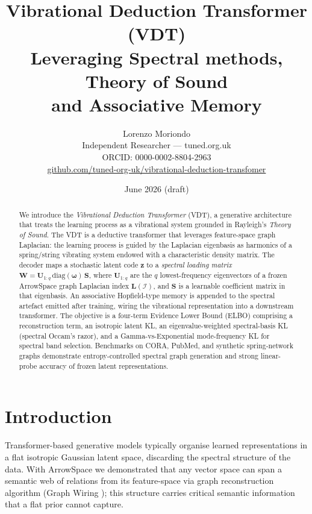 \documentclass[11pt,a4paper]{article}
\title{%
  \textbf{Vibrational Deduction Transformer (VDT)}\\[4pt]
  \large Leveraging Spectral methods, Theory of Sound\\
    and Associative Memory}
\author{%
  Lorenzo Moriondo\\[2pt]
\small Independent Researcher --- tuned.org.uk\\
\small ORCID: 0000-0002-8804-2963\\
  \href{https://github.com/tuned-org-uk/vibrational-deduction-transfomer}{%
    github.com/tuned-org-uk/vibrational-deduction-transfomer}}
\date{June 2026 (draft)}
\newcommand{\Lmat}{\mathbf{L}}
\newcommand{\Umat}{\mathbf{U}}
\newcommand{\Smat}{\mathbf{S}}
\newcommand{\Wmat}{\mathbf{W}}
\begin{document}

\maketitle

\begin{abstract}
We introduce the \emph{Vibrational Deduction Transformer} (VDT), a generative
architecture that treats the learning process as a vibrational system grounded
in Rayleigh's \emph{Theory of Sound}.
The VDT is a deductive transformer that leverages feature-space graph Laplacian:
the learning process is guided by the Laplacian eigenbasis as harmonics of a
spring/string vibrating system endowed with a characteristic density matrix.
The decoder maps a stochastic latent code $\mathbf{z}$ to a
\emph{spectral loading matrix} $\Wmat = \Umat_{1:q}\,\mathrm{diag}(\boldsymbol{\omega})\,\Smat$,
where $\Umat_{1:q}$ are the $q$ lowest-frequency eigenvectors of a frozen
ArrowSpace graph Laplacian index $\Lmat(\mathcal{I})$, and $\Smat$ is a learnable
coefficient matrix in that eigenbasis.
An associative Hopfield-type memory is appended to the spectral artefact emitted
after training, wiring the vibrational representation into a downstream transformer.
The objective is a four-term Evidence Lower Bound (ELBO) comprising a
reconstruction term, an isotropic latent KL, an eigenvalue-weighted
spectral-basis KL (spectral Occam's razor), and a Gamma-vs-Exponential
mode-frequency KL for spectral band selection.
Benchmarks on CORA, PubMed, and synthetic spring-network graphs demonstrate
entropy-controlled spectral graph generation and strong linear-probe accuracy
of frozen latent representations.
\end{abstract}

\tableofcontents
\newpage

\section{Introduction}
\label{sec:intro}

Transformer-based generative models typically organise learned representations
in a flat isotropic Gaussian latent space, discarding the spectral structure
of the data.  With ArrowSpace \cite{moriondo2026arrowspace} we demonstrated that any vector space can span a semantic web of relations from its feature-space via graph reconstruction algorithm (Graph Wiring \cite{moriondo2026graphwiring}); this structure carries critical semantic information that a flat prior cannot capture.
\end{document}
